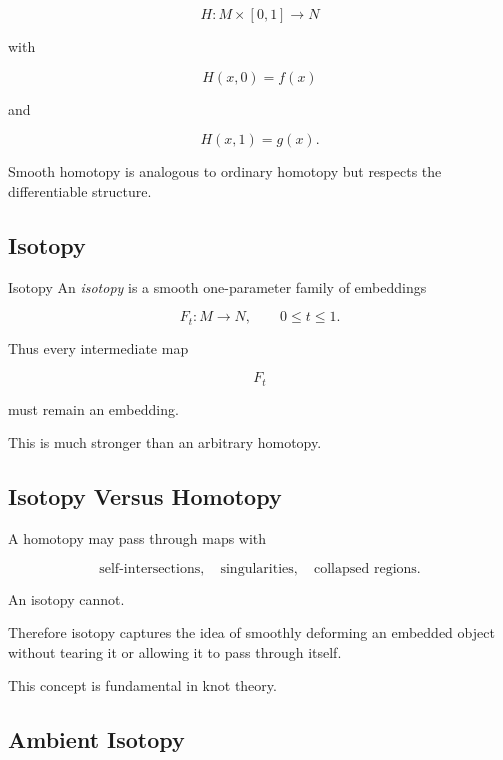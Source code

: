 \[
\boxed{
H:M\times[0,1]\to N
}
\]

with

\[
H(x,0)=f(x)
\]

and

\[
H(x,1)=g(x).
\]

Smooth homotopy is analogous to ordinary homotopy but respects the
differentiable structure.

\subsection{Isotopy}
\label{subsec:isotopy}

\begin{definitionbox}{Isotopy}
An \emph{isotopy} is a smooth one-parameter family of embeddings

\[
\boxed{
F_t:M\to N,
\qquad
0\leq t\leq1.
}
\]
\end{definitionbox}

Thus every intermediate map

\[
F_t
\]

must remain an embedding.

This is much stronger than an arbitrary homotopy.

\subsection{Isotopy Versus Homotopy}
\label{subsec:isotopy-vs-homotopy}

A homotopy may pass through maps with

\[
\boxed{
\text{self-intersections},
\quad
\text{singularities},
\quad
\text{collapsed regions}.
}
\]

An isotopy cannot.

Therefore isotopy captures the idea of smoothly deforming an embedded object
without tearing it or allowing it to pass through itself.

This concept is fundamental in knot theory.

\subsection{Ambient Isotopy}
\label{subsec:ambient-isotopy}

